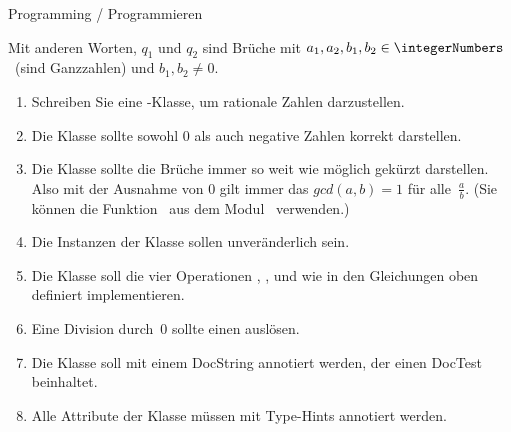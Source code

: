 \begin{question}{Programming / Programmieren}
{Mit anderen Worten, $q_1$ und $q_2$ sind Brüche mit $a_1,a_2,b_1,b_2\in\integerNumbers$~(sind Ganzzahlen) und $b_1,b_2\neq0$.\begin{enumerate}%
\item Schreiben Sie eine \python-Klasse, um rationale Zahlen darzustellen.%
\item Die Klasse sollte sowohl 0 als auch negative Zahlen korrekt darstellen.%
\item Die Klasse sollte die Brüche immer so weit wie möglich gekürzt darstellen. %
Also mit der Ausnahme von 0 gilt immer das $gcd(a,b)=1$ für alle~$\frac{a}{b}$. %
(Sie können die Funktion~ aus dem Modul~ verwenden.)%
\item Die Instanzen der Klasse sollen unveränderlich sein.%
\item Die Klasse soll die vier Operationen , ,  und  wie in den Gleichungen oben definiert implementieren.%
\item Eine Division durch~0 sollte einen  auslösen.
\item Die Klasse soll mit einem DocString annotiert werden, der einen DocTest beinhaltet.%
\item Alle Attribute der Klasse müssen mit Type-Hints annotiert werden.%
\end{enumerate}%
}%
\end{question}%
%
%
%
